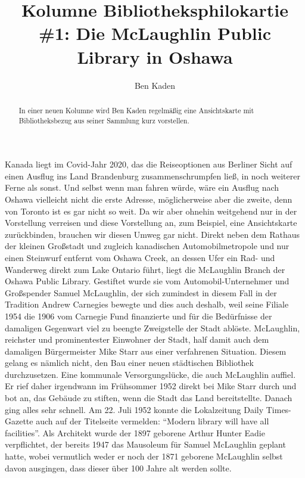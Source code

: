 \documentclass[a4paper,
fontsize=11pt,
oneside,
numbers=noperiodatend,
parskip=half-,
bibliography=totoc,
final
]{scrartcl}
\title{\LARGE{Kolumne Bibliotheksphilokartie \#1: Die McLaughlin Public Library in Oshawa}}%
\author{Ben Kaden} %
\date{}
\begin{document}
\maketitle
\thispagestyle{fancyplain} 

\begin{abstract}
\noindent
In einer neuen Kolumne wird Ben Kaden regelmäßig eine Ansichtskarte mit
Bibliotheksbezug aus seiner Sammlung kurz vorstellen.
\end{abstract}

Kanada liegt im Covid-Jahr 2020, das die Reiseoptionen aus Berliner
Sicht auf einen Ausflug ins Land Brandenburg zusammenschrumpfen ließ, in
noch weiterer Ferne als sonst. Und selbst wenn man fahren würde, wäre
ein Ausflug nach Oshawa vielleicht nicht die erste Adresse,
möglicherweise aber die zweite, denn von Toronto ist es gar nicht so
weit. Da wir aber ohnehin weitgehend nur in der Vorstellung verreisen
und diese Vorstellung an, zum Beispiel, eine Ansichtskarte zurückbinden,
brauchen wir diesen Umweg gar nicht. Direkt neben dem Rathaus der
kleinen Großstadt und zugleich kanadischen Automobilmetropole und nur
einen Steinwurf entfernt vom Oshawa Creek, an dessen Ufer ein Rad- und
Wanderweg direkt zum Lake Ontario führt, liegt die McLaughlin Branch der
Oshawa Public Library. Gestiftet wurde sie vom Automobil-Unternehmer und
Großspender Samuel McLaughlin, der sich zumindest in diesem Fall in der
Tradition Andrew Carnegies bewegte und dies auch deshalb, weil seine
Filiale 1954 die 1906 vom Carnegie Fund finanzierte und für die
Bedürfnisse der damaligen Gegenwart viel zu beengte Zweigstelle der
Stadt ablöste. McLaughlin, reichster und prominentester Einwohner der
Stadt, half damit auch dem damaligen Bürgermeister Mike Starr aus einer
verfahrenen Situation. Diesem gelang es nämlich nicht, den Bau einer
neuen städtischen Bibliothek durchzusetzen. Eine kommunale
Versorgungslücke, die auch McLaughlin auffiel. Er rief daher irgendwann
im Frühsommer 1952 direkt bei Mike Starr durch und bot an, das Gebäude
zu stiften, wenn die Stadt das Land bereitstellte. Danach ging alles
sehr schnell. Am 22. Juli 1952 konnte die Lokalzeitung Daily
Times-Gazette auch auf der Titelseite vermelden: \enquote{Modern library
will have all facilities}. Als Architekt wurde der 1897 geborene Arthur
Hunter Eadie verpflichtet, der bereits 1947 das Mausoleum für Samuel
McLaughlin geplant hatte, wobei vermutlich weder er noch der 1871
geborene McLaughlin selbst davon ausgingen, dass dieser über 100 Jahre
alt werden sollte.
\end{document}
